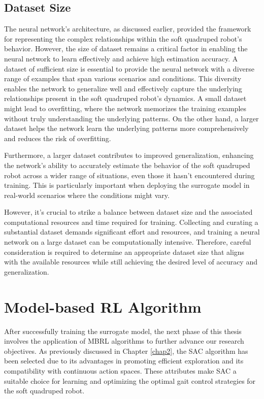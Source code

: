 \subsection{Dataset Size}
The neural network's architecture, as discussed earlier, provided the framework for representing the complex relationships within the soft quadruped robot's behavior. However, the size of dataset remains a critical factor in enabling the neural network to learn effectively and achieve high estimation accuracy. A dataset of sufficient size is essential to provide the neural network with a diverse range of examples that span various scenarios and conditions. This diversity enables the network to generalize well and effectively capture the underlying relationships present in the soft quadruped robot's dynamics. A small dataset might lead to overfitting, where the network memorizes the training examples without truly understanding the underlying patterns. On the other hand, a larger dataset helps the network learn the underlying patterns more comprehensively and reduces the risk of overfitting. 

Furthermore, a larger dataset contributes to improved generalization, enhancing the network's ability to accurately estimate the behavior of the soft quadruped robot across a wider range of situations, even those it hasn't encountered during training. This is particularly important when deploying the surrogate model in real-world scenarios where the conditions might vary.

However, it's crucial to strike a balance between dataset size and the associated computational resources and time required for training. Collecting and curating a substantial dataset demands significant effort and resources, and training a neural network on a large dataset can be computationally intensive. Therefore, careful consideration is required to determine an appropriate dataset size that aligns with the available resources while still achieving the desired level of accuracy and generalization.

\section{Model-based RL Algorithm}
After successfully training the surrogate model, the next phase of this thesis involves the application of \ac{MBRL} algorithms to further advance our research objectives. As previously discussed in Chapter \ref{chap2}, the \ac{SAC} algorithm has been selected due to its advantages in promoting efficient exploration and its compatibility with continuous action spaces. These attributes make SAC a suitable choice for learning and optimizing the optimal gait control strategies for the soft quadruped robot.

